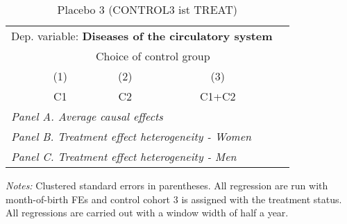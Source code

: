  \begin{table}[H] \centering \begin{threeparttable} \caption{Placebo 3 (CONTROL3 ist TREAT) } {\def\sym#1{\ifmmode^{#1}\else\(^{#1}\)\fi} \begin{tabular}{l*{4}{c}} \toprule \multicolumn{4}{l}{Dep. variable: \textbf{Diseases of the circulatory system}} \\ & \multicolumn{3}{c}{Choice of control group} \\ \cmidrule(lr){2-4}
            &\multicolumn{1}{c}{(1)}&\multicolumn{1}{c}{(2)}&\multicolumn{1}{c}{(3)}\\
            &\multicolumn{1}{c}{C1}&\multicolumn{1}{c}{C2}&\multicolumn{1}{c}{C1+C2}\\
\midrule
 \multicolumn{4}{l}{\emph{Panel A. Average causal effects}} \\      \midrule\multicolumn{4}{l}{\emph{Panel B. Treatment effect heterogeneity - Women}} \\      \midrule\multicolumn{4}{l}{\emph{Panel C. Treatment effect heterogeneity - Men}} \\      
\bottomrule \end{tabular} } \begin{tablenotes} \item \scriptsize \emph{Notes:} Clustered standard errors in parentheses. All regression are run with month-of-birth FEs and control cohort 3 is assigned with the treatment status. All regressions are carried out with a window width of half a year. \end{tablenotes} \end{threeparttable} \end{table} 
